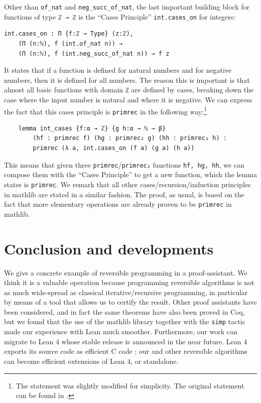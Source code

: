 \documentclass[preprint]{elsarticle}
\theoremstyle{remark}
\newcommand{\CPP}{\textsf{C}\xspace}
\newcommand{\MATHLIB}{\textsf{mathlib}\xspace}
\newcommand{\LEAN}{\textsf{Lean}\xspace}
\newcommand{\COQ}{\textsf{Coq}\xspace}
\newcommand{\LEANFour}{\textsf{Lean 4}\xspace}
\begin{document}
Other than \lstinline|of_nat| and \lstinline|neg_succ_of_nat|, the last important building block for functions of type \lstinline|ℤ → ℤ| is the ``Cases Principle'' \lstinline|int.cases_on| for integers:
\begin{lstlisting}
int.cases_on : Π {f:ℤ → Type} (z:ℤ),
    (Π (n:ℕ), f (int.of_nat n)) →
    (Π (n:ℕ), f (int.neg_succ_of_nat n)) → f z
\end{lstlisting}
\noindent
It states that if a function is defined for natural numbers and for negative numbers, then it is defined for all numbers.
The reason this is important is that almost all basic functions with domain \lstinline|ℤ| are defined by cases, breaking down the case where the input number is natural and where it is negative. We can express the fact that this cases principle is \lstinline|primrec| in the following way:\footnote{The statement was slightly modified for simplicity. The original statement can be found in \cite{MalettoRPPLEAN2021}.}
\begin{lstlisting}
    lemma int_cases {f:α → ℤ} {g h:α → ℕ → β}
        (hf : primrec f) (hg : primrec₂ g) (hh : primrec₂ h) :
        primrec (λ a, int.cases_on (f a) (g a) (h a))
\end{lstlisting}
\noindent
This means that given three \lstinline|primrec|/\lstinline|primrec₂| functions \lstinline|hf, hg, hh|, we can compose them with the ``Cases Principle'' to get a new function, which the lemma states is \lstinline|primrec|.
We remark that all other cases/recursion/induction principles in \MATHLIB are stated in a similar fashion. The proof, as usual, is based on the fact that more elementary operations are already proven to be \lstinline|primrec| in \MATHLIB.

\section{Conclusion and developments}
\label{section:Conclusion and developments}
We give a concrete example of reversible programming in a proof-assistant. We think it is a valuable operation because programming reversible algorithms is not as much wide-spread as classical iterative/recursive programming, in particular by means of a tool that allows us to certify the result.
Other proof assistants have been considered, and in fact the same theorems have also been proved in \COQ, but we found that the use of the \MATHLIB library together with the \lstinline|simp| tactic made our experience with \LEAN much smoother.
Furthermore, our work can migrate to \LEANFour whose stable release is announced in the near future. \LEANFour exports its source code as efficient \CPP code \cite{2021-LEAN4-MouraUllrich}; our and other reversible algorithms can become efficient extensions of \LEANFour, or standalone.
\end{document}
